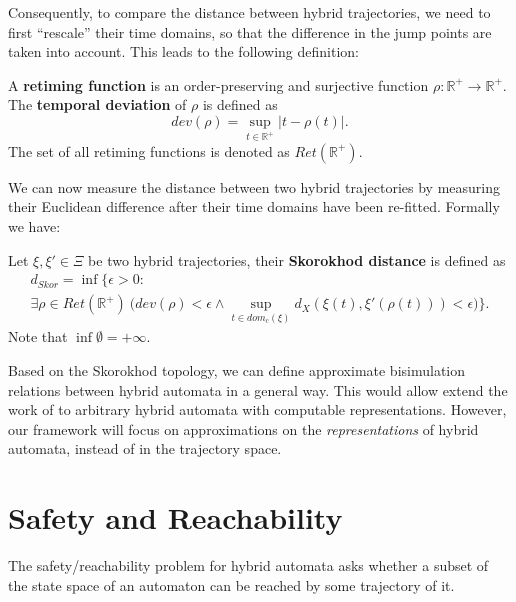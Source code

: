 \documentclass[envcountsect]{llncs}
\begin{document}
Consequently, to compare the distance between hybrid trajectories, we need to first ``rescale'' their time domains, so that the difference in the jump points are taken into account. This leads to the following definition:

\begin{definition}
A {\bf retiming function} is an order-preserving and surjective function $\rho: \mathbb{R}^+\rightarrow \mathbb{R}^+$. The {\bf temporal deviation} of $\rho$ is defined as $$dev(\rho) = \sup_{t\in \mathbb{R}^+}|t-\rho(t)|.$$ The set of all retiming functions is denoted as $Ret(\mathbb{R}^+)$. 
\end{definition}

We can now measure the distance between two hybrid trajectories by measuring their Euclidean difference after their time domains have been re-fitted. Formally we have:

\begin{definition}
 Let $\xi, \xi'\in \Xi$ be two hybrid trajectories, their {\bf Skorokhod distance} is defined as
\begin{multline*}
d_{Skor}= \inf\{\epsilon>0:\\ \exists \rho\in Ret(\mathbb{R}^+)\  \bigg( dev(\rho)<\epsilon\wedge
 \sup_{t\in dom_c(\xi)}d_X(\xi(t), \xi'(\rho(t)))<\epsilon\bigg)\}.
\end{multline*}
Note that $\inf \emptyset = +\infty$.
\end{definition}

\begin{remark}
Based on the Skorokhod topology, we can define approximate bisimulation relations between hybrid automata in a general way. This would allow extend the work of \cite{DBLP:journals/deds/GirardJP08,DBLP:journals/automatica/GirardP07} to arbitrary hybrid automata with computable representations. However, our framework will focus on approximations on the {\em representations} of hybrid automata, instead of in the trajectory space.  
\end{remark}

\section{Safety and Reachability}

The safety/reachability problem for hybrid automata asks whether a subset of the state space of an automaton can be reached by some trajectory of it. 
\end{document}
